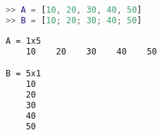 \begin{terminal}
    \begin{lstlisting}[language=MATLAB, style=notexterm]
>> A = [10, 20, 30, 40, 50]
>> B = [10; 20; 30; 40; 50]\end{lstlisting}
    \tcblower
    \begin{lstlisting}[style=notexterm, language = tex]
A = 1x5
    10    20    30    40    50

B = 5x1
    10
    20
    30
    40
    50\end{lstlisting}
\end{terminal}
